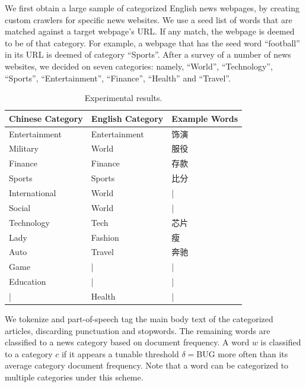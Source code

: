 \begin{CJK}{UTF8}{gbsn}
We first obtain a large sample of categorized English news webpages,
by creating custom crawlers for specific news websites.  We use a seed
list of words that are matched against a target webpage's URL.  If any
match, the webpage is deemed to be of that category.  For example, a
webpage that has the seed word ``football'' in its URL is deemed of
category ``Sports''.  After a survey of a number of news websites, we
decided on seven categories: namely, ``World'', ``Technology”,
“Sports”, “Entertainment'', ``Finance'', ``Health'' and
``Travel''.
 

\begin{table}[ht]
\centering
  \caption{Experimental results.}
  \label{table:evaluation_1}
  \begin{tabular}{| p{2.3cm} | p{2.3cm} | p{1.5cm} |}
    \hline
    Chinese Category & English Category & Example Words\\
    \hline
    Entertainment & Entertainment & 饰演\\
    \hline
    Military & World & 服役\\
    \hline
    Finance & Finance & 存款\\
    \hline
    Sports & Sports & 比分\\
    \hline
    International & World & |\\
    \hline
    Social & World & |\\
    \hline
    Technology & Tech & 芯片\\
    \hline
    Lady & Fashion & 瘦\\
    \hline
    Auto & Travel & 奔驰\\
    \hline
    Game & | & |\\
    \hline
    Education & | & |\\
    \hline
    | & Health & |\\
    \hline
  \end{tabular}
\end{table}

We tokenize and part-of-speech tag the main body text of the
categorized articles, discarding punctuation and stopwords.  The
remaining words are classified to a news category based on document
frequency.  A word $w$ is classified to a category $c$ if it appears a
tunable threshold $\delta=$BUG more often than its average category
document frequency.  Note that a word can be categorized to multiple
categories under this scheme.




\end{CJK}
